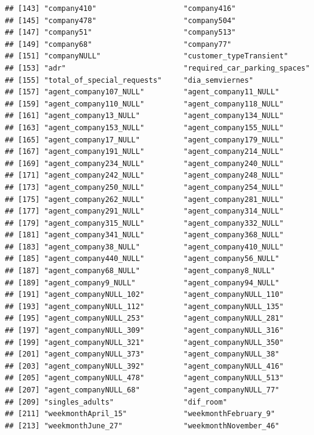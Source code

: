 \documentclass[
]{article}
\begin{document}
\begin{verbatim}
## [143] "company410"                    "company416"                   
## [145] "company478"                    "company504"                   
## [147] "company51"                     "company513"                   
## [149] "company68"                     "company77"                    
## [151] "companyNULL"                   "customer_typeTransient"       
## [153] "adr"                           "required_car_parking_spaces"  
## [155] "total_of_special_requests"     "dia_semviernes"               
## [157] "agent_company107_NULL"         "agent_company11_NULL"         
## [159] "agent_company110_NULL"         "agent_company118_NULL"        
## [161] "agent_company13_NULL"          "agent_company134_NULL"        
## [163] "agent_company153_NULL"         "agent_company155_NULL"        
## [165] "agent_company17_NULL"          "agent_company179_NULL"        
## [167] "agent_company191_NULL"         "agent_company214_NULL"        
## [169] "agent_company234_NULL"         "agent_company240_NULL"        
## [171] "agent_company242_NULL"         "agent_company248_NULL"        
## [173] "agent_company250_NULL"         "agent_company254_NULL"        
## [175] "agent_company262_NULL"         "agent_company281_NULL"        
## [177] "agent_company291_NULL"         "agent_company314_NULL"        
## [179] "agent_company315_NULL"         "agent_company332_NULL"        
## [181] "agent_company341_NULL"         "agent_company368_NULL"        
## [183] "agent_company38_NULL"          "agent_company410_NULL"        
## [185] "agent_company440_NULL"         "agent_company56_NULL"         
## [187] "agent_company68_NULL"          "agent_company8_NULL"          
## [189] "agent_company9_NULL"           "agent_company94_NULL"         
## [191] "agent_companyNULL_102"         "agent_companyNULL_110"        
## [193] "agent_companyNULL_112"         "agent_companyNULL_135"        
## [195] "agent_companyNULL_253"         "agent_companyNULL_281"        
## [197] "agent_companyNULL_309"         "agent_companyNULL_316"        
## [199] "agent_companyNULL_321"         "agent_companyNULL_350"        
## [201] "agent_companyNULL_373"         "agent_companyNULL_38"         
## [203] "agent_companyNULL_392"         "agent_companyNULL_416"        
## [205] "agent_companyNULL_478"         "agent_companyNULL_513"        
## [207] "agent_companyNULL_68"          "agent_companyNULL_77"         
## [209] "singles_adults"                "dif_room"                     
## [211] "weekmonthApril_15"             "weekmonthFebruary_9"          
## [213] "weekmonthJune_27"              "weekmonthNovember_46"         

\end{verbatim}
\end{document}
